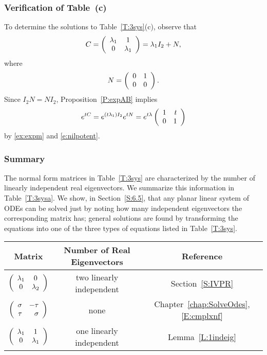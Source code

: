 \documentclass{ximera}
\begin{document}
\subsubsection{Verification of Table~\protect{\ref{T:3sys}}(c)}

To determine the solutions to Table~\ref{T:3sys}(c), observe that
\[
C = \left(\begin{array}{cc} \lambda_1 & 1\\ 0 &\lambda_1\end{array}\right) = \lambda_1 I_2 + N,
\]
where
\[
N = \left(\begin{array}{rr} 0 & 1\\ 0 &0\end{array}\right).
\]
Since $I_2N=NI_2$, Proposition~\ref{P:expAB} implies
\begin{equation}  \label{e:expshear}
e^{tC} = e^{(t\lambda_1)I_2}e^{tN} =
e^{t\lambda}\left(\begin{array}{rr} 1 & t\\ 0 &1\end{array}\right)
\end{equation}
by \eqref{ex:expm} and \eqref{e:nilpotent}.

\subsubsection{Summary}

The normal form matrices in Table~\ref{T:3sys} are characterized by the number
of linearly independent real eigenvectors.  We summarize this information in
Table~\ref{T:3sysa}.  We show, in Section~\ref{S:6.5}, that any planar
linear system of ODEs can be solved just by noting how many independent
eigenvectors the corresponding matrix has; general solutions are found by
transforming the equations into one of the three types of equations
listed in Table~\ref{T:3sys}.

\begin{table*}[htb]
\begin{center}
\begin{tabular}{|c|c|c|}
\hline
Matrix  & Number of Real Eigenvectors & Reference \\
\hline
 $\left(\begin{array}{cc} \lambda_1 & 0\\ 0 &\lambda_2\end{array}\right)$ & two linearly independent  &
Section~\ref{S:IVPR} \\
\hline
$\left(\begin{array}{rr} \sigma & -\tau\\ \tau &\sigma\end{array}\right)$ & none
& Chapter~\ref{chap:SolveOdes}, \eqref{E:cmplxnf} \\
\hline
$\left(\begin{array}{cc} \lambda_1 & 1\\ 0 &\lambda_1\end{array}\right)$ &  one linearly independent
& Lemma~\ref{L:1indeig} \\
\hline
\end{tabular}
\caption{Number of linearly independent real eigenvectors.}
\label{T:3sysa}
\end{center}
\end{table*}


\EXER

\TEXER
\end{document}
